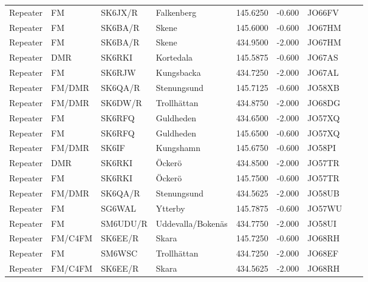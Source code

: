 \begin{longtable}{llllrrlcl}
	Repeater & FM              & SK6JX/R  & Falkenberg            &   145.6250 &   -0.600 & JO66FV &  &  \\
	Repeater & FM              & SK6BA/R  & Skene                 &   145.6000 &   -0.600 & JO67HM &  &  \\
	Repeater & FM              & SK6BA/R  & Skene                 &   434.9500 &   -2.000 & JO67HM &  &  \\
	Repeater & DMR             & SK6RKI   & Kortedala             &   145.5875 &   -0.600 & JO67AS &  &  \\
	Repeater & FM              & SK6RJW   & Kungsbacka            &   434.7250 &   -2.000 & JO67AL &  &  \\
	Repeater & FM/DMR          & SK6QA/R  & Stenungsund           &   145.7125 &   -0.600 & JO58XB &  &  \\
	Repeater & FM/DMR          & SK6DW/R  & Trollhättan           &   434.8750 &   -2.000 & JO68DG &  &  \\
	Repeater & FM              & SK6RFQ   & Guldheden             &   434.6500 &   -2.000 & JO57XQ &  &  \\
	Repeater & FM              & SK6RFQ   & Guldheden             &   145.6500 &   -0.600 & JO57XQ &  &  \\
	Repeater & FM/DMR          & SK6IF    & Kungshamn             &   145.6750 &   -0.600 & JO58PI &  &  \\
	Repeater & DMR             & SK6RKI   & Öckerö                &   434.8500 &   -2.000 & JO57TR &  &  \\
	Repeater & FM              & SK6RKI   & Öckerö                &   145.7500 &   -0.600 & JO57TR &  &  \\
	Repeater & FM/DMR          & SK6QA/R  & Stenungsund           &   434.5625 &   -2.000 & JO58UB &  &  \\
	Repeater & FM              & SG6WAL   & Ytterby               &   145.7875 &   -0.600 & JO57WU &  &  \\
	Repeater & FM              & SM6UDU/R & Uddevalla/Bokenäs     &   434.7750 &   -2.000 & JO58UI &  &  \\
	Repeater & FM/C4FM         & SK6EE/R  & Skara                 &   145.7250 &   -0.600 & JO68RH &  &  \\
	Repeater & FM              & SM6WSC   & Trollhättan           &   434.7250 &   -2.000 & JO68EF &  &  \\
	Repeater & FM/C4FM         & SK6EE/R  & Skara                 &   434.5625 &   -2.000 & JO68RH &  &  \\

\end{longtable}
